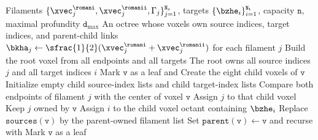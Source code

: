 \begin{algorithm}[h]
  \caption{Octree construction}
  \label{alg:octree_algorithm}
  \begin{algorithmic}
  \Require Filaments $\{\xvec_j^\romani,\xvec_j^\romanii,\Gamma_j\}_{j=1}^{\mathtt{N}_\mathrm{s}}$, targets $\{\bzhe_i\}_{i=1}^{\mathtt{N}_{\mathrm{t}}}$, capacity $\mathtt{n}$, maximal profundity $\mathtt{d}_{\mathrm{max}}$
  \Ensure An octree whose voxels own source indices, target indices, and parent-child links
  \State $\bkha_j \gets \sfrac{1}{2}(\xvec_j^\romani+\xvec_j^\romanii)$ for each filament $j$
  \State Build the root voxel from all endpoints and all targets
  \State The root owns all source indices $j$ and all target indices $i$
  \State {}
      \State Mark $\mathtt{v}$ as a leaf and \Return
    \EndIf
    \State Create the eight child voxels of $\mathtt{v}$
    \State Initialize empty child source-index lists and child target-index lists
      \State Compare both endpoints of filament $j$ with the center of voxel $\mathtt{v}$
        \State Assign $j$ to that child voxel
      \Else
        \State Keep $j$ owned by $\mathtt{v}$
      \EndIf
    \EndFor
      \State Assign $i$ to the child voxel octant containing $\bzhe_i$
    \EndFor
    \State Replace $\mathtt{sources}(\mathtt{v})$ by the parent-owned filament list
      \State Set $\mathtt{parent}(\mathtt{v})\gets \mathtt{v}$ and recurse with 
    \EndFor
      \State Mark $\mathtt{v}$ as a leaf
    \EndIf
  \EndFunction
  \end{algorithmic}
\end{algorithm}

